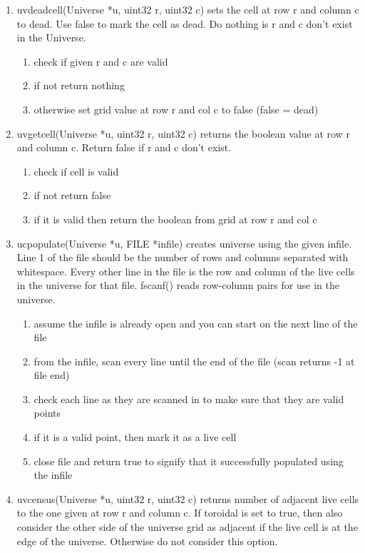 \documentclass[11pt]{article}
\begin{document}
\begin{enumerate}
\begin{enumerate}
\begin{enumerate}
			\end{enumerate}
		\item uvdeadcell(Universe *u, uint32 r, uint32 c) sets the cell at row r and column c to dead. Use false to mark the cell as dead. Do nothing is r and c don't exist in the Universe.
			\begin{enumerate}
			\item check if given r and c are valid
			\item if not return nothing
			\item otherwise set grid value at row r and col c to false (false = dead)
			\end{enumerate}
		\item uvgetcell(Universe *u, uint32 r, uint32 c) returns the boolean value at row r and column c. Return false if r and c don't exist.
			\begin{enumerate}
			\item check if cell is valid
			\item if not return false
			\item if it is valid then return the boolean from grid at row r and col c
			\end{enumerate}
		\item ucpopulate(Universe *u, FILE *infile) creates universe using the given infile. Line 1 of the file should be the number of rows and columns separated with whitespace. Every other line in the file is the row and column of the live cells in the universe for that file. fscanf() reads row-column pairs for use in the universe.
			\begin{enumerate}
			\item assume the infile is already open and you can start on the next line of the file
			\item from the infile, scan every line until the end of the file (scan returns -1 at file end)
			\item check each line as they are scanned in to make sure that they are valid points
			\item if it is a valid point, then mark it as a live cell
			\item close file and return true to signify that it successfully populated using the infile
			\end{enumerate}
		\item uvcensus(Universe *u, uint32 r, uint32 c) returns number of adjacent live cells to the one given at row r and column c. If toroidal is set to true, then also consider the other side of the universe grid as adjacent if the live cell is at the edge of the universe. Otherwise do not consider this option.

\end{enumerate}
\end{enumerate}
\end{document}

